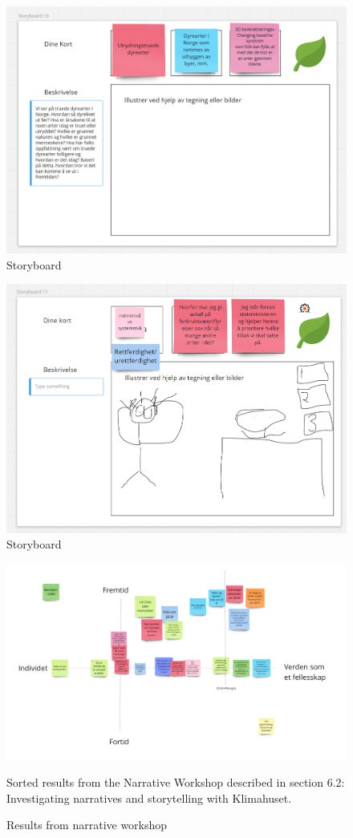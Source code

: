 \begin{figure}[H]
    \centering 
    \includegraphics[width=12.5cm]{pictures/appendix/narrative/s10.PNG}
    \caption{Storyboard}
\end{figure}

\begin{figure}[H]
    \centering 
    \includegraphics[width=12.5cm]{pictures/appendix/narrative/s11.PNG}
    \caption{Storyboard}
\end{figure}

\begin{figure}[H]
    \centering 
    \includegraphics[width=12cm]{pictures/process/workshop_results.png}
    \caption{Results from narrative workshop}{Sorted results from the Narrative Workshop described in section 6.2: Investigating narratives and storytelling with Klimahuset.}
\end{figure}

